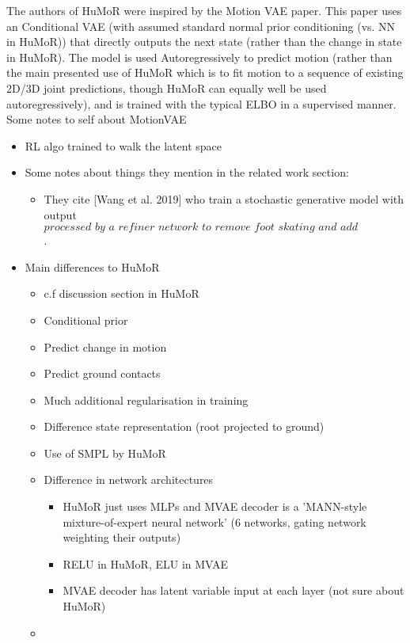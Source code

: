 The authors of HuMoR \cite{humor} were inspired by the Motion VAE \cite{MVAE} paper. This paper uses an Conditional VAE (with assumed standard normal prior conditioning (vs. NN in HuMoR)) that directly outputs the next state (rather than the change in state in HuMoR). The model is used Autoregressively to predict motion (rather than the main presented use of HuMoR which is to fit motion to a sequence of existing 2D/3D joint predictions, though HuMoR can equally well be used autoregressively), and is trained with the typical ELBO in a supervised manner. \\
Some notes to self about MotionVAE
\begin{itemize}
    \item RL algo trained to walk the latent space
    \item Some notes about things they mention in the related work section:
    \begin{itemize}
        \item They cite [Wang et al. 2019] who train a stochastic generative model with output $\textit{processed by a refiner network to remove foot skating and add robustness}$.
    \end{itemize}
    \item Main differences to HuMoR
    \begin{itemize}
        \item c.f discussion section in HuMoR
        \item Conditional prior
        \item Predict change in motion
        \item Predict ground contacts
        \item Much additional regularisation in training
        \item Difference state representation (root projected to ground)
        \item Use of SMPL by HuMoR
        \item Difference in network architectures
        \begin{itemize}
            \item HuMoR just uses MLPs and MVAE decoder is a 'MANN-style mixture-of-expert neural network' (6 networks, gating network weighting their outputs)
            \item RELU in HuMoR, ELU in MVAE
            \item MVAE decoder has latent variable input at each layer (not sure about HuMoR)
        \end{itemize}
        \item 
    \end{itemize}
\end{itemize}


